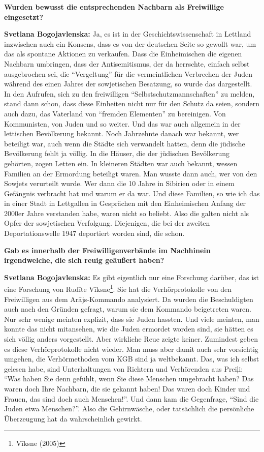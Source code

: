 \textbf{Wurden bewusst die entsprechenden Nachbarn als Freiwillige eingesetzt?}

\textbf{Svetlana Bogojavlenska:} Ja, es ist in der Geschichtswissenschaft in Lettland inzwischen auch ein Konsens, dass es von der deutschen Seite so gewollt war, um das als spontane Aktionen zu verkaufen. Dass die Einheimischen die eigenen Nachbarn umbringen, dass der Antisemitismus, der da herrschte, einfach selbst ausgebrochen sei, die "`Vergeltung"' für die vermeintlichen Verbrechen der Juden während des einen Jahres der sowjetischen Besatzung, so wurde das dargestellt. In den Aufrufen, sich zu den freiwilligen "`Selbstschutzmannschaften"' zu melden, stand dann schon, dass diese Einheiten nicht nur für den Schutz da seien, sondern auch dazu, das Vaterland von "`fremden Elementen"' zu bereinigen. Von Kommunisten, von Juden und so weiter. Und das war auch allgemein in der lettischen Bevölkerung bekannt. Noch Jahrzehnte danach war bekannt, wer beteiligt war, auch wenn die Städte sich verwandelt hatten, denn die jüdische Bevölkerung fehlt ja völlig. In die Häuser, die der jüdischen Bevölkerung gehörten, zogen Letten ein. In kleineren Städten war auch bekannt, wessen Familien an der Ermordung beteiligt waren. Man wusste dann auch, wer von den Sowjets verurteilt wurde. Wer dann die 10 Jahre in Sibirien oder in einem Gefängnis verbracht hat und warum er da war. Und diese Familien, so wie ich das in einer Stadt in Lettgallen in Gesprächen mit den Einheimischen Anfang der 2000er Jahre verstanden habe, waren nicht so beliebt. Also die galten nicht als Opfer der sowjetischen Verfolgung. Diejenigen, die bei der zweiten Deportationswelle 1947 deportiert worden sind, die schon.

\textbf{Gab es innerhalb der Freiwilligenverbände im Nachhinein irgendwelche, die sich reuig geäußert haben?}

\textbf{Svetlana Bogojavlenska:} Es gibt eigentlich nur eine Forschung darüber, das ist eine Forschung von Rudīte Vīksne\footnote{Vīksne (2005)}.  Sie hat die Verhörprotokolle von den Freiwilligen aus dem Arājs-Kommando analysiert. Da wurden die Beschuldigten auch nach den Gründen gefragt, warum sie dem Kommando beigetreten waren. Nur sehr wenige meinten explizit, dass sie Juden hassten. Und viele meinten, man konnte das nicht mitansehen, wie die Juden ermordet worden sind, sie hätten es sich völlig anders vorgestellt. Aber wirkliche Reue zeigte keiner. Zumindest geben es diese Verhörprotokolle nicht wieder. Man muss aber damit auch sehr vorsichtig umgehen, die Verhörmethoden vom KGB sind ja weltbekannt. Das, was ich selbst gelesen habe, sind Unterhaltungen von Richtern und Verhörenden aus Preiļi: "`Was haben Sie denn gefühlt, wenn Sie diese Menschen umgebracht haben? Das waren doch Ihre Nachbarn, die sie gekannt haben! Das waren doch Kinder und Frauen, das sind doch auch Menschen!"'. Und dann kam die Gegenfrage, "`Sind die Juden etwa Menschen?"'. Also die Gehirnwäsche, oder tatsächlich die persönliche Überzeugung hat da wahrscheinlich gewirkt.

